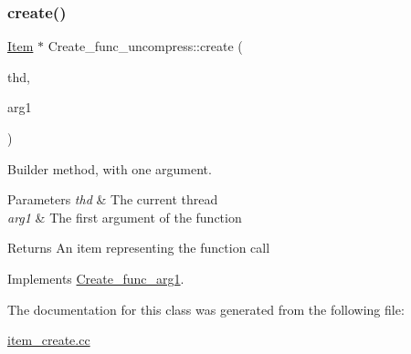 \subsubsection{\texorpdfstring{create()}{create()}}
{\footnotesize\ttfamily \mbox{\hyperlink{classItem}{Item}} $\ast$ Create\+\_\+func\+\_\+uncompress\+::create (\begin{DoxyParamCaption}\item[{T\+HD $\ast$}]{thd,  }\item[{\mbox{\hyperlink{classItem}{Item}} $\ast$}]{arg1 }\end{DoxyParamCaption})\hspace{0.3cm}{\ttfamily [virtual]}}

Builder method, with one argument. 
\begin{DoxyParams}{Parameters}
{\em thd} & The current thread \\
\hline
{\em arg1} & The first argument of the function \\
\hline
\end{DoxyParams}
\begin{DoxyReturn}{Returns}
An item representing the function call 
\end{DoxyReturn}


Implements \mbox{\hyperlink{classCreate__func__arg1_a3e9a98f755cd82c3e762e334c955a8c9}{Create\+\_\+func\+\_\+arg1}}.



The documentation for this class was generated from the following file\+:\begin{DoxyCompactItemize}
\item 
\mbox{\hyperlink{item__create_8cc}{item\+\_\+create.\+cc}}\end{DoxyCompactItemize}
